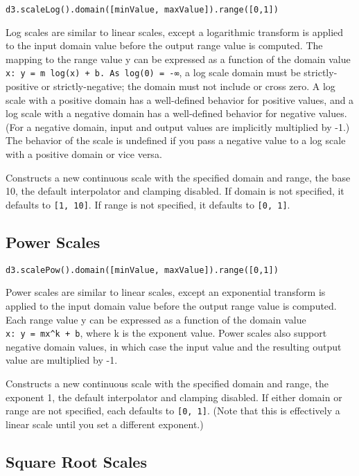 \documentclass[
]{book}
\begin{document}
\texttt{d3.scaleLog().domain({[}minValue,\ maxValue{]}).range({[}0,1{]})}

Log scales are similar to linear scales, except a logarithmic transform is applied to the input domain value before the output range value is computed. The mapping to the range value y can be expressed as a function of the domain value \texttt{x:\ y\ =\ m\ log(x)\ +\ b.\ As\ log(0)\ =\ -∞}, a log scale domain must be strictly-positive or strictly-negative; the domain must not include or cross zero. A log scale with a positive domain has a well-defined behavior for positive values, and a log scale with a negative domain has a well-defined behavior for negative values. (For a negative domain, input and output values are implicitly multiplied by -1.) The behavior of the scale is undefined if you pass a negative value to a log scale with a positive domain or vice versa.

Constructs a new continuous scale with the specified domain and range, the base 10, the default interpolator and clamping disabled. If domain is not specified, it defaults to \texttt{{[}1,\ 10{]}}. If range is not specified, it defaults to \texttt{{[}0,\ 1{]}}.

\hypertarget{power-scales}{%
\subsection*{Power Scales}\label{power-scales}}


\texttt{d3.scalePow().domain({[}minValue,\ maxValue{]}).range({[}0,1{]})}

Power scales are similar to linear scales, except an exponential transform is applied to the input domain value before the output range value is computed. Each range value y can be expressed as a function of the domain value \texttt{x:\ y\ =\ mx\^{}k\ +\ b}, where k is the exponent value. Power scales also support negative domain values, in which case the input value and the resulting output value are multiplied by -1.

Constructs a new continuous scale with the specified domain and range, the exponent 1, the default interpolator and clamping disabled. If either domain or range are not specified, each defaults to \texttt{{[}0,\ 1{]}}. (Note that this is effectively a linear scale until you set a different exponent.)

\hypertarget{square-root-scales}{%
\subsection*{Square Root Scales}\label{square-root-scales}}
\end{document}
